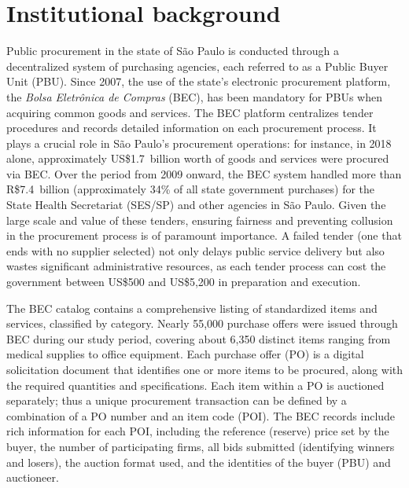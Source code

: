 \section{Institutional background}\label{hist}
Public procurement in the state of São Paulo is conducted through a decentralized system of purchasing agencies, each referred to as a Public Buyer Unit (PBU). Since 2007, the use of the state's electronic procurement platform, the \emph{Bolsa Eletrônica de Compras} (BEC), has been mandatory for PBUs when acquiring common goods and services. The BEC platform centralizes tender procedures and records detailed information on each procurement process. It plays a crucial role in São Paulo's procurement operations: for instance, in 2018 alone, approximately US\$1.7~billion worth of goods and services were procured via BEC. Over the period from 2009 onward, the BEC system handled more than R\$7.4~billion (approximately 34\% of all state government purchases) for the State Health Secretariat (SES/SP) and other agencies in São Paulo. Given the large scale and value of these tenders, ensuring fairness and preventing collusion in the procurement process is of paramount importance. A failed tender (one that ends with no supplier selected) not only delays public service delivery but also wastes significant administrative resources, as each tender process can cost the government between US\$500 and US\$5,200 in preparation and execution.

The BEC catalog contains a comprehensive listing of standardized items and services, classified by category. Nearly 55,000 purchase offers were issued through BEC during our study period, covering about 6,350 distinct items ranging from medical supplies to office equipment. Each purchase offer (PO) is a digital solicitation document that identifies one or more items to be procured, along with the required quantities and specifications. Each item within a PO is auctioned separately; thus a unique procurement transaction can be defined by a combination of a PO number and an item code (POI). The BEC records include rich information for each POI, including the reference (reserve) price set by the buyer, the number of participating firms, all bids submitted (identifying winners and losers), the auction format used, and the identities of the buyer (PBU) and auctioneer.

